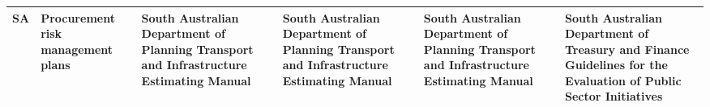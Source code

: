 \begin{tabularx}{\textwidth}{>{\bfseries\arraybackslash}lYYYYY}
SA   & Procurement risk management plans                     & South Australian Department of Planning Transport and Infrastructure Estimating Manual & 	South Australian Department of Planning Transport and Infrastructure Estimating Manual                 & 	South Australian Department of Planning Transport and Infrastructure Estimating Manual                 & 	South Australian Department of Treasury and Finance  Guidelines for the Evaluation of Public Sector Initiatives \\
\bottomrule
\end{tabularx}
